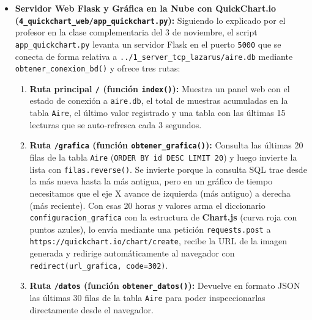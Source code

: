 \documentclass[11pt,a4paper]{article}
\begin{document}
\begin{itemize}[leftmargin=1.5em, itemsep=0.35em]
    \item \textbf{Servidor Web Flask y Gráfica en la Nube con QuickChart.io (\texttt{4\_quickchart\_web/app\_quickchart.py}):}
    Siguiendo lo explicado por el profesor en la clase complementaria del 3 de noviembre, el script \texttt{app\_quickchart.py} levanta un servidor Flask en el puerto \texttt{5000} que se conecta de forma relativa a \texttt{../1\_server\_tcp\_lazarus/aire.db} mediante \texttt{obtener\_conexion\_bd()} y ofrece tres rutas:
    \begin{enumerate}[leftmargin=1.5em, itemsep=0.2em]
        \item \textbf{Ruta principal \texttt{/} (función \texttt{index()}):} Muestra un panel web con el estado de conexión a \texttt{aire.db}, el total de muestras acumuladas en la tabla \texttt{Aire}, el último valor registrado y una tabla con las últimas 15 lecturas que se auto-refresca cada 3 segundos.
        \item \textbf{Ruta \texttt{/grafica} (función \texttt{obtener\_grafica()}):} Consulta las últimas 20 filas de la tabla \texttt{Aire} (\texttt{ORDER BY id DESC LIMIT 20}) y luego invierte la lista con \texttt{filas.reverse()}. Se invierte porque la consulta SQL trae desde la más nueva hasta la más antigua, pero en un gráfico de tiempo necesitamos que el eje X avance de izquierda (más antiguo) a derecha (más reciente). Con esas 20 horas y valores arma el diccionario \texttt{configuracion\_grafica} con la estructura de \textbf{Chart.js} (curva roja con puntos azules), lo envía mediante una petición \texttt{requests.post} a \texttt{https://quickchart.io/chart/create}, recibe la URL de la imagen generada y redirige automáticamente al navegador con \texttt{redirect(url\_grafica, code=302)}.
        \item \textbf{Ruta \texttt{/datos} (función \texttt{obtener\_datos()}):} Devuelve en formato JSON las últimas 30 filas de la tabla \texttt{Aire} para poder inspeccionarlas directamente desde el navegador.
    \end{enumerate}
\end{itemize}
\end{document}
